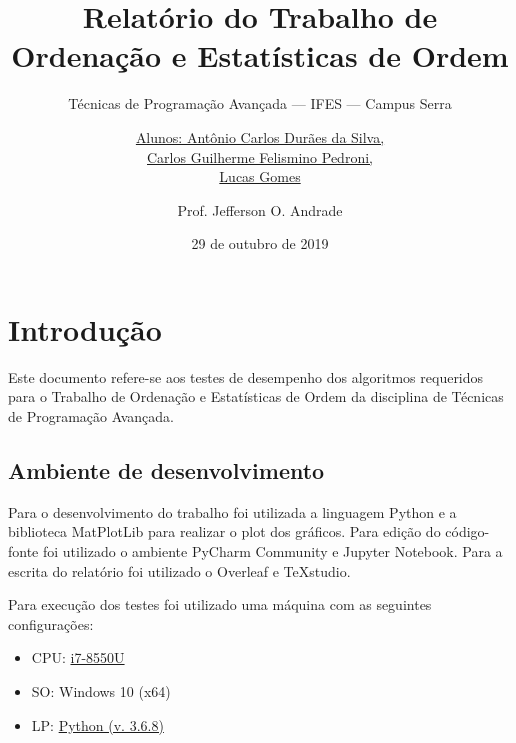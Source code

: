 \documentclass[a4paper,12pt]{scrartcl}
\title{Relatório do Trabalho de Ordenação e Estatísticas de Ordem}
\subtitle{Técnicas de Programação Avançada --- IFES --- Campus Serra}
\author{\uline{Alunos: Antônio Carlos Durães da Silva, \\Carlos Guilherme Felismino Pedroni, \\Lucas Gomes}
  \and Prof. Jefferson O. Andrade}
\date{29 de outubro de 2019}
\begin{document}
\maketitle
\tableofcontents
\listoflistings
\listoffigures

\section{Introdução}

Este  documento refere-se aos testes de desempenho dos algoritmos requeridos para o Trabalho de Ordenação e Estatísticas de Ordem da disciplina de Técnicas de Programação Avançada.
\begin{comment}
\section{Enunciado}

Este trabalho consiste de duas etapas:

\begin{enumerate}
\item Implementação de um conjunto de algoritmos de ordenação.
\item Análise do desempenho dos algoritmos implementados.
\end{enumerate}

A descrição destas duas etapas será vista com mais detalhes abaixo.
\end{comment}

\subsection{Ambiente de desenvolvimento}
\label{sec:implementacao}

Para o desenvolvimento do trabalho foi utilizada a linguagem Python e a biblioteca MatPlotLib para realizar o plot dos gráficos. Para edição do código-fonte foi utilizado o ambiente PyCharm Community e Jupyter Notebook. Para a escrita do relatório foi utilizado o Overleaf e TeXstudio.

Para execução dos testes foi utilizado uma máquina com as seguintes configurações:
\begin{itemize}
    \item CPU: \href{https://www.intel.com.br/content/www/br/pt/products/processors/core/i7-processors/i7-8550u.html}{i7-8550U}
    \item SO: Windows 10 (x64)
    \item LP: \href{https://www.python.org/downloads/release/python-368/}{Python (v. 3.6.8)}
\end{itemize}
\end{document}
